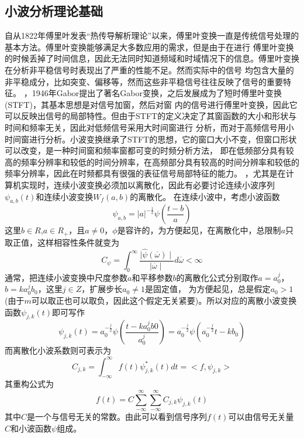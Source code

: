 \subsection{小波分析理论基础}
自从1822年傅里叶发表“热传导解析理论”以来，傅里叶变换一直是传统信号处理的基本方法。傅里叶变换能够满足大多数应用的需求，但是由于在进行
傅里叶变换的时候丢掉了时间信息，因此无法同时知道频域和时域情况下的信息。傅里叶变换在分析非平稳信号时表现出了严重的性能不足。然而实际中的信号
均包含大量的非平稳成分，比如突变、偏移等，然而这些非平稳信号往往反映了信号的重要特征。
，1946年Gabor提出了著名Gabor变换，之后发展成为了短时傅里叶变换(STFT)，其基本思想是对信号加窗，然后对窗
内的信号进行傅里叶变换，因此它可以反映出信号的局部特性。但由于STFT的定义决定了其窗函数的大小和形状与时间和频率无关，因此对低频信号采用大时间窗进行
分析，而对于高频信号用小时间窗进行分析。小波变换继承了STFT的思想，它的窗口大小不变，但窗口形状可以改变，是一种时间窗和频率窗都可变的时频分析方法， 
即在低频部分具有较高的频率分辨率和较低的时间分辨率，在高频部分具有较高的时间分辨率和较低的频率分辨率，因此在时频都具有很强的表征信号局部特征的能力。
，尤其是在计算机实现时，连续小波变换必须加以离散化，因此有必要讨论连续小波序列$\psi_{a,b}(t)$和连续小波变换$W_{f}(a,b)$的离散化。
在连续小波中，考虑小波函数
\begin{equation}
	\psi_{a,b}=|a|^{-\frac{1}{2}}\psi(\frac{t-b}{a})
\end{equation}
这里$b\in R$,$a\in R_{+}$，且$a\neq0$，$\phi$是容许的，为方便起见，在离散化中，总限制$a$只取正值，这样相容性条件就变为
\begin{equation}
	C_{\psi}=\int^{\infty}_{0}\frac{\mid \widehat{\psi}(\overline{\omega})\mid}{\mid \overline{\omega}\mid}d\overline{\omega} < \infty
\end{equation}
通常，把连续小波变换中尺度参数$a$和平移参数$b$的离散化公式分别取作$a=a_{0}^{j}$，$b=ka_{0}^{j}b_{0}$，这里$j\in Z$，扩展步长$a_{0}\neq 1$是固定值，
为方便起见，总是假定$a_{0}>1$(由于$m$可以取正也可以取负，因此这个假定无关紧要)。所以对应的离散小波变换函数$\psi_{j,k}(t)$即可写作
\begin{equation}
	\psi_{j,k}(t)=a^{-\frac{j}{2}}_{0}\psi(\frac{t-ka_{0}^{j}b0}{a_{0}^{j}})=a_{0}^{-\frac{j}{2}}\psi(a_{0}^{-\frac{j}{2}}t-kb_{0})
\end{equation}
而离散化小波系数则可表示为
\begin{equation}
	C_{j,k}=\int_{-\infty}^{\infty}f(t)\psi_{j,k}^{*}(t)dt=<f,\psi_{j,k}>
\end{equation}
其重构公式为
\begin{equation}
	f(t)=C\sum_{-\infty}^{\infty}\sum_{-\infty}^{\infty}C_{j,k}\psi_{j,k}(t)
\end{equation}
其中$C$是一个与信号无关的常数。由此可以看到信号序列$f(t)$可以由信号无关量$C$和小波函数$\psi$组成。
